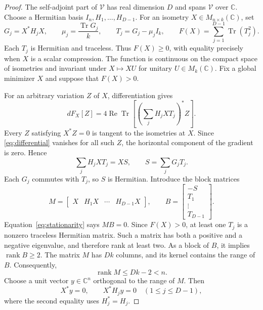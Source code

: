 \documentclass[11pt]{article}
\newcommand{\C}{\mathbb C}
\newcommand{\V}{\mathcal V}
\DeclareMathOperator{\Tr}{Tr}
\DeclareMathOperator{\rank}{rank}
\theoremstyle{remark}
\numberwithin{equation}{section}
\begin{document}
\begin{proof}
The self-adjoint part of $\V$ has real dimension $D$ and spans $\V$
over $\C$. Choose a Hermitian basis $I_n,H_1,\ldots,H_{D-1}$.
For an isometry $X\in M_{n\times k}(\C)$, set
\begin{equation}\label{eq:objective}
 G_j=X^*H_jX,\qquad
 \mu_j=\frac{\Tr G_j}{k},\qquad
 T_j=G_j-\mu_j I_k,\qquad
 F(X)=\sum_{j=1}^{D-1}\Tr(T_j^2).
\end{equation}
Each $T_j$ is Hermitian and traceless. Thus $F(X)\ge0$, with equality
precisely when $X$ is a scalar compression. The function is continuous
on the compact space of isometries and invariant under $X\mapsto XU$
for unitary $U\in M_k(\C)$. Fix a global minimizer $X$ and suppose
that $F(X)>0$.

For an arbitrary variation $Z$ of $X$, differentiation gives
\begin{equation}\label{eq:differential}
 dF_X[Z]=4\operatorname{Re}\Tr\!\left[
 \left(\sum_jH_jXT_j\right)^*Z\right].
\end{equation}
Every $Z$ satisfying $X^*Z=0$ is tangent to the isometries at $X$.
Since \eqref{eq:differential} vanishes for all such $Z$, the horizontal
component of the gradient is zero. Hence
\begin{equation}\label{eq:stationarity}
 \sum_j H_jXT_j=XS,\qquad
 S=\sum_jG_jT_j.
\end{equation}
Each $G_j$ commutes with $T_j$, so $S$ is Hermitian. Introduce the block
matrices
\begin{equation}\label{eq:dependencies}
 M=\begin{bmatrix}X&H_1X&\cdots&H_{D-1}X\end{bmatrix},
 \qquad
 B=\begin{bmatrix}-S\\T_1\\\vdots\\T_{D-1}\end{bmatrix}.
\end{equation}
Equation~\eqref{eq:stationarity} says $MB=0$. Since $F(X)>0$, at least
one $T_j$ is a nonzero traceless Hermitian matrix. Such a matrix has
both a positive and a negative eigenvalue, and therefore rank at least
two. As a block of $B$, it implies $\rank B\ge2$. The matrix $M$ has
$Dk$ columns, and its kernel contains the range of $B$. Consequently,
\begin{equation}\label{eq:rank-defect}
 \rank M\le Dk-2<n.
\end{equation}
Choose a unit vector $y\in\C^n$ orthogonal to the range of $M$. Then
\begin{equation}\label{eq:orthogonality}
 X^*y=0,\qquad X^*H_jy=0\quad(1\le j\le D-1),
\end{equation}
where the second equality uses $H_j^*=H_j$.


\end{proof}
\end{document}
